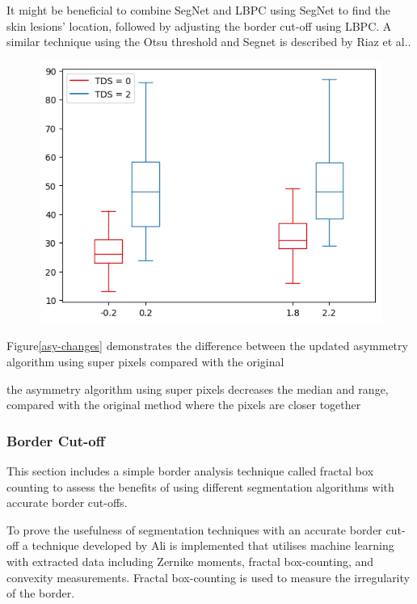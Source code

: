 It might be beneficial to combine SegNet and LBPC using SegNet to find the skin lesions' location, followed by adjusting the border cut-off using LBPC. A similar technique using the Otsu threshold and Segnet is described by Riaz et al.\cite{Riaz2019}.

\begin{figure}
    \centering
    \includegraphics[scale=1.2]{images/asymmetry/asy-changes.png}
    \caption{} 
\end{figure}\label{asy-changes}

Figure\ref{asy-changes} demonstrates the difference between the updated asymmetry algorithm using super pixels compared with the original


the asymmetry algorithm using super pixels decreases the median and range, compared with the original method where the pixels are closer together


\subsubsection{Border Cut-off}
This section includes a simple border analysis technique called fractal box counting to assess the benefits of using different segmentation algorithms with accurate border cut-offs.

To prove the usefulness of segmentation techniques with an accurate border cut-off a technique developed by Ali\cite{Ali2020b} is implemented that utilises machine learning with extracted data including Zernike moments, fractal box-counting, and convexity measurements. Fractal box-counting is used to measure the irregularity of the border.

